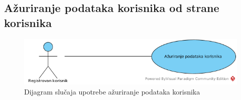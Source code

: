 \subsection{\bfseries Ažuriranje podataka korisnika od strane korisnika}

\begin{figure}[H]
\begin{center}
\includegraphics[scale=0.9]{Pictures/UC_UpdateUserProfile.png}
\end{center}
    \caption{Dijagram slučaja upotrebe ažuriranje podataka korisnika}
\label{fig:RegistracijaPrijavljivanje}
\end{figure}

